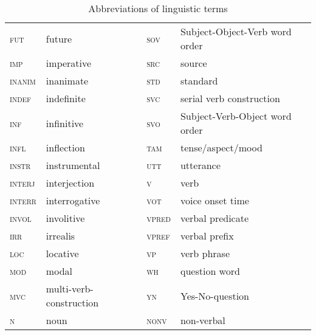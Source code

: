 \begin{table}
\begin{tabular}{ll|ll}
 \textsc{fut} 	& future & \textsc{sov} 	& Subject-Object-Verb word order \\
 \textsc{imp} 	& imperative & \textsc{src} 	& source \\
 \textsc{inanim} 	& inanimate & \textsc{std} 	& standard \\
 \textsc{indef} 	& indefinite & \textsc{svc} 	& serial verb construction \\
 \textsc{inf} 	& infinitive & \textsc{svo} 	& Subject-Verb-Object word order \\
 \textsc{infl} 	& inflection & \textsc{tam} 	& tense/aspect/mood \\
 \textsc{instr} 	& instrumental & \textsc{utt} 	& utterance \\
 \textsc{interj} 	& interjection & \textsc{v} 	& verb \\
 \textsc{interr} 	& interrogative & \textsc{vot} 	& voice onset time \\
 \textsc{invol} 	& involitive & \textsc{vpred} 	& verbal predicate \\
 \textsc{irr} 	& irrealis & \textsc{vpref} 	& verbal prefix \\
 \textsc{loc} 	& locative & \textsc{vp} 	& verb phrase \\
 \textsc{mod} 	& modal & \textsc{wh} 	& question word \\
 \textsc{mvc} 	& multi-verb-construction & \textsc{yn} 	& Yes-No-question \\
 \textsc{n} 	& noun & \textsc{nonv} & non-verbal\\
 		\end{tabular}
 	\caption{Abbreviations of linguistic terms} 
 \end{table}
 
 
